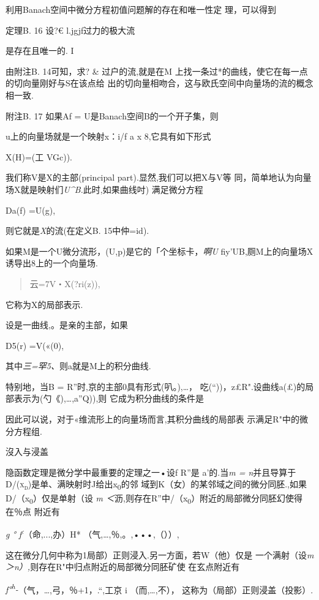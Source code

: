 利用Banach空间中微分方程初值问题解的存在和唯一性定 理，可以得到

定理B. 16 设?€ l.jgjf过力的极大流

是存在且唯一的. I

由附注B. 14可知，求? \& 过户的流,就是在M
上找一条过*的曲线，使它在每一点的切向量刚好与S在该点给
出的切向量相吻合，这与欧氏空间中向量场的流的概念相一致.

附注B. 17 如果Af = U是Banach空间B的一个开子集，则

u上的向量场就是一个映射x：i/f a x 8,它具有如下形式

X(H)=(工 VGc)).

我们称V是X的主部(principal part).显然,我们可以把X与V等
同，简单地认为向量场X就是映射们\emph{U\^{}B.}此时,如果曲线吋)
满足微分方程

Da(f) =U(g),

则它就是\emph{X}的流(在定义B. 15中仲=id).

如果M是一个U微分流形，(U,p)是它的「个坐标卡，\emph{啊U}
fiy'UB,厕M上的向量场X诱导出8上的一个向量场.

\begin{quote}
云=7V・X(?ri(z)),
\end{quote}

它称为X的局部表示.

设是一曲线,。是亲的主部，如果

D5(r) =V(«(0),

其中\emph{三=罕5、}则a就是M上的积分曲线.

特别地，当B = R''时,京的主部0具有形式(叭。),\ldots{}，
吃(``))，z£R".设曲线a(£)的局部表示为(勺《),\ldots{},a''Q)),则
它成为积分曲线的条件是

因此可以说，对于«维流形上的向量场而言,其积分曲线的局部表
示满足R"中的微分方程组.

沒入与浸盖

隐函数定理是微分学中最重要的定理之一•设f R''是 a'的.当\emph{m =
n}并且导算于\textsc{D/(x\textsubscript{d})}是单、满映射时J给出x\textsubscript{0}的邻
域到K（女）的某邻域之间的微分同胚.,如果D/（x\textsubscript{0}）仅是单射（设
\emph{m
＜}沥,则存在R''中/（x\textsubscript{0}）附近的局部微分同胚幻使得在％点
附近有

\emph{g ° f\textsuperscript{:}}（命,...,办）H*
（气,\ldots{},％,。,•••,（））,

这在微分几何中称为1局部）正则浸入.另一方面，若W（他）仅是
一个满射（设\emph{m＞n）,}则存在R"中归点附近的局部微分同胚矿使
在玄点附近有

\emph{f°\textsuperscript{h}-}（气，\ldots{},弓，％+1，.``,工京 i
（而,\ldots{},不）， 这称为（局部）正则浸盖（投影）.

